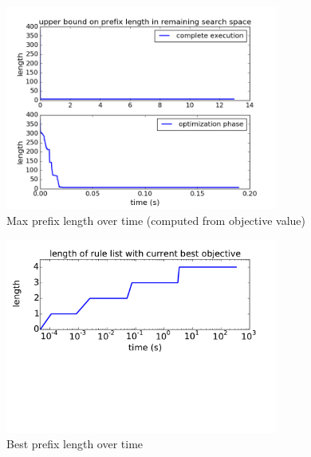 \begin{arxiv}
\begin{figure}[t!]
\begin{center}
\includegraphics[width=0.8\textwidth]{figs/ela-max-length-check.png}
\end{center}
\caption{Max prefix length over time (computed from objective value)}
\label{fig:max-length}
\end{figure}

\begin{figure}[t!]
\begin{center}
\includegraphics[width=0.8\textwidth]{figs/ela_compas-prefix-length.pdf}
\end{center}
\caption{Best prefix length over time}
\label{fig:prefix-length}
\end{figure}
\end{arxiv}
